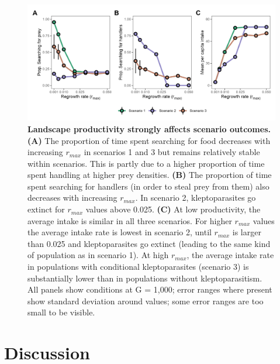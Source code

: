 \begin{figure}[t!]
    \centering
    \includegraphics[width=\textwidth]{figures/kleptomove/fig_06.png}
    \caption{
        \textbf{Landscape productivity strongly affects scenario outcomes.}
        \textbf{(A)} The proportion of time spent searching for food decreases with increasing $r_{max}$ in scenarios 1 and 3 but remains relatively stable within scenarios. 
        This is partly due to a higher proportion of time spent handling at higher prey densities. 
        \textbf{(B)} The proportion of time spent searching for handlers (in order to steal prey from them) also decreases with increasing $r_{max}$. 
        In scenario 2, kleptoparasites go extinct for $r_{max}$ values above 0.025. 
        \textbf{(C)} At low productivity, the average intake is similar in all three scenarios. 
        For higher $r_{max}$ values the average intake rate is lowest in scenario 2, until $r_{max}$ is larger than 0.025 and kleptoparasites go extinct (leading to the same kind of population as in scenario 1). 
        At high $r_{max}$, the average intake rate in populations with conditional kleptoparasites (scenario 3) is substantially lower than in populations without kleptoparasitism.
        All panels show conditions at G = 1,000; error ranges where present show standard deviation around values; some error ranges are too small to be visible.
    }
    \label{klepto_fig_06}
\end{figure}

\section*{Discussion}

